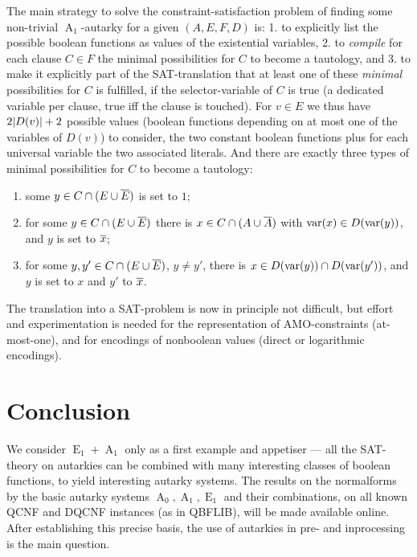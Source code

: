 \documentclass[conference]{IEEEtran}
\DeclareMathOperator{\Aaut}{A}
\DeclareMathOperator{\Eaut}{E}
\begin{document}
The main strategy to solve the constraint-satisfaction problem of finding some non-trivial $\Aaut_1$-autarky for a given $(A,E,F,D)$ is:
1. to explicitly list the possible boolean functions as values of the existential variables,
2. to \emph{compile} for each clause $C \in F$ the minimal possibilities for $C$ to become a tautology, and
3. to make it explicitly part of the SAT-translation that at least one of these \emph{minimal} possibilities for $C$ is fulfilled, if the selector-variable of $C$ is true (a dedicated variable per clause, true iff the clause is touched).
For $v \in E$ we thus have $2 \lvert D(v) \rvert + 2$ possible values (boolean functions depending on at most one of the variables of $D(v)$) to consider, the two constant boolean functions plus for each universal variable the two associated literals.
And there are exactly three types of minimal possibilities for $C$ to become a tautology:
\begin{enumerate}
\item some $y \in C \cap (E \cup \overline E)$ is set to $1$;
\item for some $y \in C \cap (E \cup \overline E)$ there is $x \in C \cap (A \cup \overline A)$ with $\operatorname{var}(x) \in D(\operatorname{var}(y))$, and $y$ is set to $\overline x$;
\item for some $y, y' \in C \cap (E \cup \overline E)$, $y \ne y'$, there is $x \in D(\operatorname{var}(y)) \cap D(\operatorname{var}(y'))$, and $y$ is set to $x$ and $y'$ to $\overline x$.
\end{enumerate}
The translation into a SAT-problem is now in principle not difficult, but effort and experimentation is needed for the representation of AMO-constraints (at-most-one), and for encodings of nonboolean values (direct or logarithmic encodings).


\section{Conclusion}
\label{sec:conc}

We consider $\Eaut_1 + \Aaut_1$ only as a first example and appetiser --- all the SAT-theory on autarkies can be combined with many interesting classes of boolean functions, to yield interesting autarky systems.
The results on the normalforms by the basic autarky systems $\Aaut_0, \Aaut_1, \Eaut_1$ and their combinations, on all known QCNF and DQCNF instances (as in QBFLIB), will be made available online.
After establishing this precise basis, the use of autarkies in pre- and inprocessing is the main question.





\BibliographyOKlibrary
\end{document}
